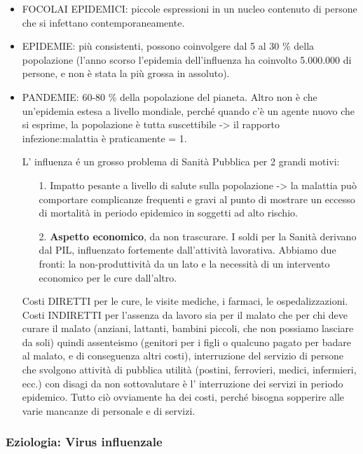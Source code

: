 \begin{itemize}
\item
  FOCOLAI EPIDEMICI: piccole espressioni in un nucleo contenuto di
  persone che si infettano contemporaneamente.
\item
  EPIDEMIE: più consistenti, possono coinvolgere dal 5 al 30 \% della
  popolazione (l'anno scorso l'epidemia dell'influenza ha coinvolto
  5.000.000 di persone, e non è stata la più grossa in assoluto).
\item
  PANDEMIE: 60-80 \% della popolazione del pianeta. Altro non è che
  un'epidemia estesa a livello mondiale, perché quando c'è un agente
  nuovo che si esprime, la popolazione è tutta suscettibile -> il
  rapporto infezione:malattia è praticamente = 1.

  L' influenza é un grosso problema di Sanità Pubblica per 2 grandi
  motivi:

\begin{itemize}

\item[1.]
  Impatto pesante a livello di salute sulla popolazione -> la malattia
  può comportare complicanze frequenti e gravi al punto di mostrare un
  eccesso di mortalità in periodo epidemico in soggetti ad alto rischio.
\item[2.]
  \textbf{Aspetto economico}, da non trascurare. I soldi per la Sanità
  derivano dal PIL, influenzato fortemente dall'attività lavorativa.
  Abbiamo due fronti: la non-produttività da un lato e la necessità di un intervento economico per le cure dall'altro.
\end{itemize}

  Costi DIRETTI per le cure, le visite mediche, i farmaci, le
  ospedalizzazioni. Costi INDIRETTI per l'assenza da lavoro sia per il
  malato che per chi deve curare il malato (anziani, lattanti, bambini
  piccoli, che non possiamo lasciare da soli) quindi assenteismo
  (genitori per i figli o qualcuno pagato per badare al malato, e di
  conseguenza altri costi), interruzione del servizio di persone che
  svolgono attività di pubblica utilità (postini, ferrovieri, medici,
  infermieri, ecc.) con disagi da non sottovalutare è l' interruzione
  dei servizi in periodo epidemico. Tutto ciò ovviamente ha dei costi,
  perché bisogna sopperire alle varie mancanze di personale e di
  servizi.
\end{itemize}

\subsubsection{Eziologia: Virus influenzale}

